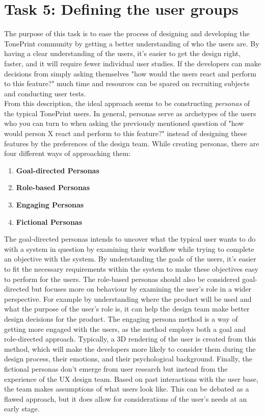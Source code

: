 \section{Task 5: Defining the user groups}
\label{Task5}
The purpose of this task is to ease the process of designing and developing the TonePrint community by getting a better understanding of who the users are. By having a clear understanding of the users, it's easier to get the design right, faster, and it will require fewer individual user studies. If the developers can make decisions from simply asking themselves "how would the users react and perform to this feature?" much time and resources can be spared on recruiting subjects and conducting user tests.\\

\noindent
From this description, the ideal approach seems to be constructing \textit{personas} of the typical TonePrint users. In general, personas serve as archetypes of the users who you can turn to when asking the previously mentioned question of "how would person X react and perform to this feature?" instead of designing these features by the preferences of the design team. While creating personas, there are four different ways of approaching them:
%
\begin{enumerate}
    \item \textbf{Goal-directed Personas}
    \item \textbf{Role-based Personas}
    \item \textbf{Engaging Personas}
    \item \textbf{Fictional Personas}
\end{enumerate}
%
\noindent
The goal-directed personas intends to uncover what the typical user wants to do with a system in question by examining their workflow while trying to complete an objective with the system. By understanding the goals of the users, it's easier to fit the necessary requirements within the system to make these objectives easy to perform for the users. The role-based personas should also be considered goal-directed but focuses more on behaviour by examining the user's role in a wider perspective. For example by understanding where the product will be used and what the purpose of the user's role is, it can help the design team make better design decisions for the product. The engaging persona method is a way of getting more engaged with the users, as the method employs both a goal and role-directed approach. Typically, a 3D rendering of the user is created from this method, which will make the developers more likely to consider them during the design process, their emotions, and their psychological background. Finally, the fictional personas don't emerge from user research but instead from the experience of the UX design team. Based on past interactions with the user base, the team makes assumptions of what users look like. This can be debated as a flawed approach, but it does allow for considerations of the user's needs at an early stage.\\

